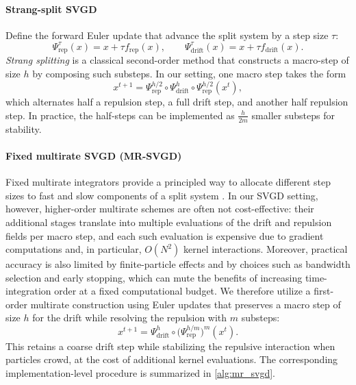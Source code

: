 \paragraph{Strang-split SVGD}

Define the forward Euler update that advance the split system by a step size
$\tau$:
\begin{equation*}
  \Psi_{\text{rep}}^{\tau}(x) = x + \tau f_{\text{rep}}(x),
  \qquad
  \Psi_{\text{drift}}^{\tau}(x) = x + \tau f_{\text{drift}}(x).
\end{equation*}
\emph{Strang
splitting} \cite{strang1968difference} is a classical second-order method that
constructs a macro-step of size $h$ by composing such
substeps. In our setting, one macro step takes the form
\begin{equation}
  x^{t+1}
  = \Psi_{\text{rep}}^{h/2}\circ\Psi_{\text{drift}}^{h}\circ\Psi_{\text{rep}}^{h/2}(x^{t}),
  \label{eq:strang-split-svgd}
\end{equation}
which alternates half a repulsion step, a full drift step, and another half
repulsion step. In practice, the half-steps can be implemented as
$\frac{h}{2m}$ smaller substeps for stability.

\paragraph{Fixed multirate SVGD (MR-SVGD)}
Fixed multirate integrators provide a principled way to allocate different step
sizes to fast and slow components of a split system
\cite{Sandu_2016_MR-GARK,sarshar2019mrgark,sarshar2021implicitgark}. In our SVGD
setting, however, higher-order multirate schemes are often not cost-effective:
their additional stages translate into multiple evaluations of the drift and
repulsion fields per macro step, and each such evaluation is expensive due to
gradient computations and, in particular, $O(N^2)$ kernel interactions.
Moreover, practical accuracy is also limited by finite-particle effects and by
choices such as bandwidth selection and early stopping, which can mute the
benefits of increasing time-integration order at a fixed computational budget.
We therefore utilize a first-order multirate construction using Euler updates that preserves a macro step of size $h$ for the drift while resolving the
repulsion with $m$ substeps:
\begin{equation}
  x^{t+1}
  = \Psi_{\text{drift}}^{h}\circ\Big(\Psi_{\text{rep}}^{h/m}\Big)^{m}(x^{t}).
  \label{eq:mr-svgd}
\end{equation}
This retains a coarse drift step while stabilizing the repulsive interaction
when particles crowd, at the cost of additional kernel evaluations. The
corresponding implementation-level procedure is summarized in
\cref{alg:mr_svgd}.

